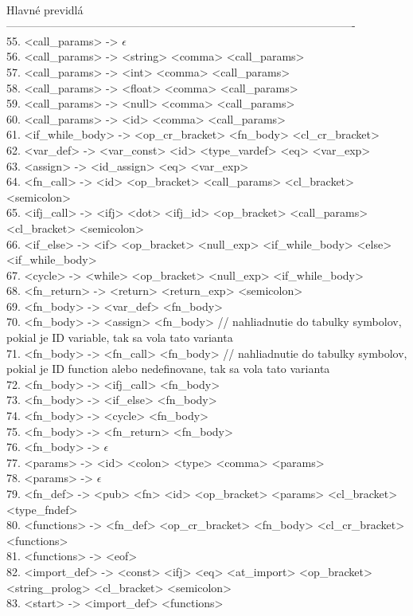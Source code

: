 \documentclass[Slovak, a4paper, 12pt]{article}
\begin{document}
	\\
	Hlavné previdlá\\
	----------------------------------------------------------------------------------------------\\
	55. <call\_params> -> $\epsilon$\\
	56. <call\_params> -> <string> <comma> <call\_params>\\
	57. <call\_params> -> <int> <comma> <call\_params>\\
	58. <call\_params> -> <float> <comma> <call\_params>\\
	59. <call\_params> -> <null> <comma> <call\_params>\\
	60. <call\_params> -> <id> <comma> <call\_params>\\
	61. <if\_while\_body> -> <op\_cr\_bracket> <fn\_body> <cl\_cr\_bracket>\\
	62. <var\_def> -> <var\_const> <id> <type\_vardef> <eq> <var\_exp>\\
	63. <assign> -> <id\_assign> <eq> <var\_exp>\\
	64. <fn\_call> -> <id> <op\_bracket> <call\_params> <cl\_bracket> <semicolon>\\
	65. <ifj\_call> -> <ifj> <dot> <ifj\_id> <op\_bracket> <call\_params> <cl\_bracket> <semicolon>\\
	66. <if\_else> -> <if> <op\_bracket> <null\_exp> <if\_while\_body> <else> <if\_while\_body>\\
	67. <cycle> -> <while> <op\_bracket> <null\_exp> <if\_while\_body>\\
	68. <fn\_return> -> <return> <return\_exp> <semicolon>\\
	69. <fn\_body> -> <var\_def> <fn\_body>\\
	70. <fn\_body> -> <assign> <fn\_body> // nahliadnutie do tabulky symbolov, pokial je ID variable, tak sa vola tato varianta\\
	71. <fn\_body> -> <fn\_call> <fn\_body> // nahliadnutie do tabulky symbolov, pokial je ID function alebo nedefinovane, tak sa vola tato varianta\\
	72. <fn\_body> -> <ifj\_call> <fn\_body> \\
	73. <fn\_body> -> <if\_else> <fn\_body>\\
	74. <fn\_body> -> <cycle> <fn\_body>\\
	75. <fn\_body> -> <fn\_return> <fn\_body>\\
	76. <fn\_body> -> $\epsilon$\\
	77. <params> -> <id> <colon> <type> <comma> <params>\\
	78. <params> -> $\epsilon$\\
	79. <fn\_def> -> <pub> <fn> <id> <op\_bracket> <params> <cl\_bracket> <type\_fndef> \\
	80. <functions> -> <fn\_def> <op\_cr\_bracket> <fn\_body> <cl\_cr\_bracket> <functions>\\
	81. <functions> -> <eof>\\
	82. <import\_def> -> <const> <ifj> <eq> <at\_import> <op\_bracket> <string\_prolog> <cl\_bracket> <semicolon>\\
	83. <start> -> <import\_def> <functions>
	\vfill
\end{document}
